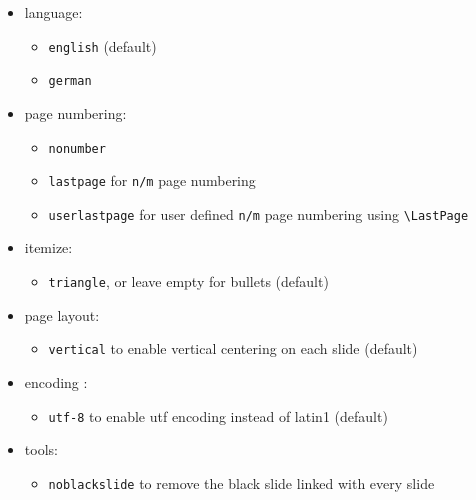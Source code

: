 \documentclass[11pt, a4paper, landscape]{article}
\begin{document}
\NewPage{}
\vfill
\begin{itemize}
\item language: 
  \begin{itemize}
  \item \texttt{english} (default)
  \item \texttt{german}
  \end{itemize}
\item page numbering: 
  \begin{itemize}
  \item \texttt{nonumber}
  \item \texttt{lastpage} for \texttt{n/m} page numbering
  \item \texttt{userlastpage} for user defined \texttt{n/m} page numbering using \texttt{\textbackslash LastPage}
  \end{itemize}
\item itemize: 
  \begin{itemize}
  \item \texttt{triangle}, or leave empty for bullets (default)
  \end{itemize}
\item page layout: 
  \begin{itemize}
  \item \texttt{vertical} to enable vertical centering on each slide (default) %
  \end{itemize}
\item encoding : 
  \begin{itemize}
  \item \texttt{utf-8} to enable utf encoding instead of latin1 (default)
  \end{itemize}
\item tools: 
  \begin{itemize}
  \item \texttt{noblackslide} to remove the black slide linked with every slide
  \end{itemize}
\end{itemize}
\vfill
\end{document}
